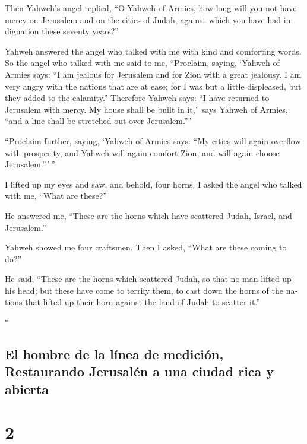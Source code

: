 \begin{paracol}{2}
\begin{otherlanguage}{english}
 Then Yahweh's angel replied, ``O Yahweh of Armies, how
long will you not have mercy on Jerusalem and on the cities of Judah,
against which you have had indignation these seventy years?''

 Yahweh answered the angel who talked with me with kind
and comforting words.  So the angel who talked with me
said to me, ``Proclaim, saying, `Yahweh of Armies says: ``I am jealous
for Jerusalem and for Zion with a great jealousy.  I am
very angry with the nations that are at ease; for I was but a little
displeased, but they added to the calamity.''  Therefore
Yahweh says: ``I have returned to Jerusalem with mercy. My house shall
be built in it,'' says Yahweh of Armies, ``and a line shall be stretched
out over Jerusalem.''\,'

 ``Proclaim further, saying, `Yahweh of Armies says: ``My
cities will again overflow with prosperity, and Yahweh will again
comfort Zion, and will again choose Jerusalem.''\,'\,''

 I lifted up my eyes and saw, and behold, four horns.
 I asked the angel who talked with me, ``What are
these?''

He answered me, ``These are the horns which have scattered Judah,
Israel, and Jerusalem.''

 Yahweh showed me four craftsmen.  Then I
asked, ``What are these coming to do?''

He said, ``These are the horns which scattered Judah, so that no man
lifted up his head; but these have come to terrify them, to cast down
the horns of the nations that lifted up their horn against the land of
Judah to scatter it.''

\end{otherlanguage}

\switchcolumn[0]*

\hypertarget{el-hombre-de-la-luxednea-de-mediciuxf3n-restaurando-jerusaluxe9n-a-una-ciudad-rica-y-abierta}{%
\subsection{El hombre de la línea de medición, Restaurando Jerusalén a
una ciudad rica y
abierta}\label{el-hombre-de-la-luxednea-de-mediciuxf3n-restaurando-jerusaluxe9n-a-una-ciudad-rica-y-abierta}}

\hypertarget{section-2}{%
\section{2}\label{section-2}}


\end{paracol}
